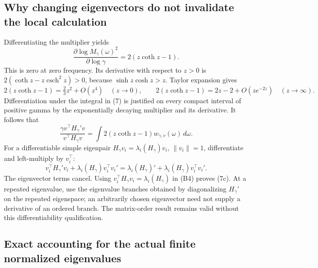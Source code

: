 \documentclass[11pt]{article}
\begin{document}
\subsection{Why changing eigenvectors do not invalidate the local calculation}

Differentiating the multiplier yields
\[
\frac{\partial\log M_\gamma(\omega)^2}{\partial\log\gamma}
=2(z\coth z-1).
\tag{B3}
\]
This is zero at zero frequency. Its derivative with respect to \(z>0\) is
\(2(\coth z-z\operatorname{csch}^2z)>0\), because
\(\sinh z\cosh z>z\). Taylor expansion gives
\[
2(z\coth z-1)=\tfrac23z^2+O(z^4)
\quad(z\to0),\qquad
2(z\coth z-1)=2z-2+O(ze^{-2z})
\quad(z\to\infty).
\]
Differentiation under the integral in (7) is justified on every compact interval of positive gamma by the exponentially decaying multiplier and its derivative. It follows that
\[
\frac{\gamma v^\top H_\gamma'v}{v^\top H_\gamma v}
=\int 2(z\coth z-1)w_{\gamma,v}(\omega)\,d\omega.
\tag{B4}
\]
For a differentiable simple eigenpair \(H_\gamma v_i=\lambda_i(H_\gamma)v_i\), \(\|v_i\|=1\), differentiate and left-multiply by \(v_i^\top\):
\[
v_i^\top H_\gamma'v_i+\lambda_i(H_\gamma)v_i^\top v_i'
=\lambda_i(H_\gamma)'+\lambda_i(H_\gamma)v_i^\top v_i'.
\]
The eigenvector terms cancel. Using \(v_i^\top H_\gamma v_i=\lambda_i(H_\gamma)\) in (B4) proves (7c). At a repeated eigenvalue, use the eigenvalue branches obtained by diagonalizing \(H_\gamma'\) on the repeated eigenspace; an arbitrarily chosen eigenvector need not supply a derivative of an ordered branch. The matrix-order result remains valid without this differentiability qualification.

\subsection{Exact accounting for the actual finite normalized eigenvalues}
\end{document}
